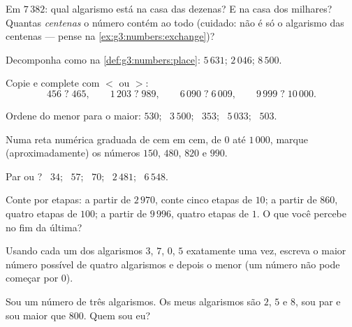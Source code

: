 \begin{exercise}[$\star$]\label{exo:g3:numbers:3}
Em $7\,382$: qual algarismo está na casa das dezenas? E na casa dos
milhares? Quantas \emph{centenas} o número contém ao todo (cuidado:
não é só o algarismo das centenas --- pense na
\cref{ex:g3:numbers:exchange})?
\end{exercise}

\begin{exercise}[$\star$]\label{exo:g3:numbers:4}
Decomponha como na \cref{def:g3:numbers:place}:
$5\,631$; \quad $2\,046$; \quad $8\,500$.
\end{exercise}

\begin{exercise}[$\star$]\label{exo:g3:numbers:5}
Copie e complete com $<$ ou $>$:
\[
456 \;?\; 465, \qquad
1\,203 \;?\; 989, \qquad
6\,090 \;?\; 6\,009, \qquad
9\,999 \;?\; 10\,000 .
\]
\end{exercise}

\begin{exercise}[$\star$]\label{exo:g3:numbers:6}
Ordene do menor para o maior: $530$; \ $3\,500$; \ $353$; \ $5\,033$;
\ $503$.
\end{exercise}

\begin{exercise}[$\star$]\label{exo:g3:numbers:7}
Numa reta numérica graduada de cem em cem, de $0$ até $1\,000$,
marque (aproximadamente) os números $150$, $480$, $820$ e $990$.
\end{exercise}

\begin{exercise}[$\star$]\label{exo:g3:numbers:8}
Par ou ? \ $34$; \ $57$; \ $70$; \ $2\,481$; \ $6\,548$.
\end{exercise}

\begin{exercise}[$\star$]\label{exo:g3:numbers:9}
Conte por etapas: a partir de $2\,970$, conte cinco etapas de $10$;
a partir de $860$, quatro etapas de $100$; a partir de $9\,996$,
quatro etapas de $1$. O que você percebe no fim da última?
\end{exercise}

\begin{exercise}[$\star\star$]\label{exo:g3:numbers:10}
Usando cada um dos algarismos $3$, $7$, $0$, $5$ exatamente uma vez,
escreva o maior número possível de quatro algarismos e depois o
menor (um número não pode começar por $0$).
\end{exercise}

\begin{exercise}[$\star\star$]\label{exo:g3:numbers:11}
Sou um número de três algarismos. Os meus algarismos são $2$, $5$ e
$8$, sou par e sou maior que $800$. Quem sou eu?
\end{exercise}
